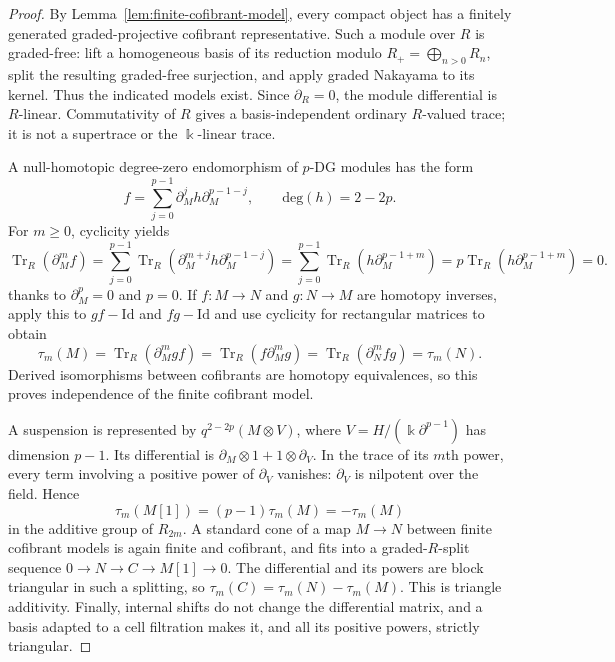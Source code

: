 \documentclass[11pt]{article}
\theoremstyle{definition}
\numberwithin{equation}{section}
\def\Id{\mathrm{Id}}
\newcommand{\kk}{\Bbbk}
\begin{document}
\begin{proof}
By Lemma~\ref{lem:finite-cofibrant-model}, every compact object has a
finitely generated graded-projective cofibrant representative.  Such a
module over $R$ is graded-free: lift a homogeneous basis of its reduction
modulo $R_+=\bigoplus_{n>0}R_n$, split the resulting graded-free
surjection, and apply
graded Nakayama to its kernel.  Thus the indicated models exist.
Since $\partial_R=0$, the module differential is $R$-linear.
Commutativity of $R$ gives a basis-independent ordinary $R$-valued trace;
it is not a supertrace or the $\kk$-linear trace.

A null-homotopic degree-zero endomorphism of $p$-DG modules has the
form~\cite[Section~5.4]{QYHopf}
\[
 f=\sum_{j=0}^{p-1}\partial_M^j h\partial_M^{p-1-j},\qquad \mathrm{deg}(h)=2-2p.
\]
For $m\ge 0$, cyclicity yields
\begin{equation}\label{eq:gap-null-trace}
 \operatorname{Tr}_R(\partial_M^m f)
 =\sum_{j=0}^{p-1}\operatorname{Tr}_R(\partial_M^{m+j}h\partial_M^{p-1-j})
 =\sum_{j=0}^{p-1}\operatorname{Tr}_R(h\partial_M^{p-1+m})= p \operatorname{Tr}_R(h\partial_M^{p-1+m})=0.
\end{equation}
thanks to $\partial_M^p=0$ and $p=0$.  If $f:M\to N$ and $g:N\to M$ are homotopy inverses,
apply this to $gf-\Id$ and $fg-\Id$ and use cyclicity for rectangular
matrices to obtain
\[
 \tau_m(M)=\operatorname{Tr}_R(\partial_M^m gf)
 =\operatorname{Tr}_R(f\partial_M^m g)
 =\operatorname{Tr}_R(\partial_N^m fg)=\tau_m(N).
\]
Derived isomorphisms between cofibrants are homotopy equivalences, so
this proves independence of the finite cofibrant model.

A suspension is represented by
$q^{2-2p}(M\otimes V)$, where
$V=H/(\kk\partial^{p-1})$ has dimension $p-1$.  Its differential is
$\partial_M\otimes1+1\otimes \partial_V$.  In the trace of its $m$th power, every term
involving a positive power of $\partial_V$ vanishes: $\partial_V$ is nilpotent over the
field.  Hence
\[
 \tau_m(M[1])=(p-1)\tau_m(M)=-\tau_m(M)
\]
in the additive group of $R_{2m}$.  A standard cone of a map $M\to N$
between finite cofibrant models is again finite and cofibrant, and fits
into a graded-$R$-split sequence
$0\to N\to C\to M[1]\to0$.
The differential and its powers are block triangular in such a
splitting, so $\tau_m(C)=\tau_m(N)-\tau_m(M)$.
This is triangle additivity.  Finally, internal shifts do not change the
differential matrix, and a basis adapted to a cell filtration makes it,
and all its positive powers, strictly triangular.
\end{proof}
\end{document}
